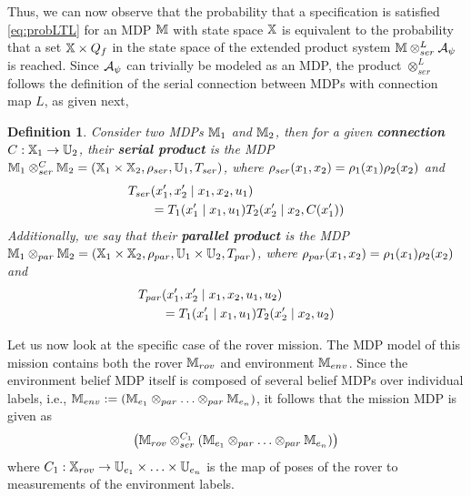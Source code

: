 \documentclass[conference]{IEEEtran}
\newtheorem{definition}{Definition}
\begin{document}
Thus, we can now observe that the probability that a specification is satisfied \eqref{eq:probLTL}
for an MDP  $\mathbb{M}$  with state space $\mathbb{X}$ is equivalent to the probability that a set $\mathbb{X}\times Q_f$ in the state space of the extended product system $\mathbb{M} \otimes_{ser}^L \mathcal{A}_\psi$ is reached. 
Since $\mathcal{A}_\psi$ can trivially be modeled as an MDP, the product  $ \otimes_{ser}^L$ follows the definition of the serial connection between MDPs with connection map $L$, as given next, 
\begin{definition} Consider two MDPs  $\mathbb{M}_1$ and $\mathbb{M}_2$, then  for a given   \textbf{connection} $C : \mathbb{X}_1 \rightarrow \mathbb{U}_2$, their \textbf{serial product} is the MDP $\mathbb{M}_1 \otimes_{ser}^C \mathbb{M}_2 = (\mathbb{X}_1 \times \mathbb{X}_2, \rho_{ser}, \mathbb{U}_1, T_{ser})$,
  where $\rho_{ser}(x_1, x_2) = \rho_1(x_1) \rho_2(x_2)$
  and
  \begin{equation}\label{eq:serial}
  \begin{aligned}
      \tr_{ser}&(x_1', x_2' \mid x_1, x_2, u_1) \\
      & = \tr_1 (x_1' \mid x_1, u_1) \tr_2 (x_2' \mid x_2, C(x_1') )
  \end{aligned}
  \end{equation}
  Additionally, we say that their  \textbf{parallel product} is the MDP $\mathbb{M}_1 \otimes_{par} \mathbb{M}_2 = (\mathbb{X}_1 \times \mathbb{X}_2, \rho_{par}, \mathbb{U}_1 \times \mathbb{U}_2, T_{par})$, where $\rho_{par}(x_1, x_2) = \rho_1(x_1) \rho_2(x_2)$
  and
  \begin{equation}
  \begin{aligned}
      T_{par}&(x_1', x_2' \mid x_1, x_2, u_1, u_2) \\
      & = T_1 (x_1' \mid x_1, u_1) T_2 (x_2' \mid x_2, u_2)
  \end{aligned}
  \end{equation}
\end{definition}
 
 Let us now look at the specific case of the rover mission. The MDP model of this mission contains both the rover $\mathbb{M}_{rov}$ and environment $\mathbb{M}_{env}$. 
Since   the environment belief MDP itself is composed of several belief MDPs over individual labels, i.e., $\mathbb{M}_{env}:=\left( \mathbb{M}_{e_1} \otimes_{par} \ldots \otimes_{par} \mathbb{M}_{e_n} \right) $, it follows that the mission MDP is given as 
 \[\left( \mathbb{M}_{rov} \otimes_{ser}^{C_1}\left( \mathbb{M}_{e_1} \otimes_{par} \ldots \otimes_{par} \mathbb{M}_{e_n} \right) \right)
  \]
  where $C_1 : \mathbb{X}_{rov} \rightarrow \mathbb{U}_{e_1} \times \ldots \times \mathbb{U}_{e_n}$  is the map of poses of the rover to measurements of the environment labels.
 
\end{document}

